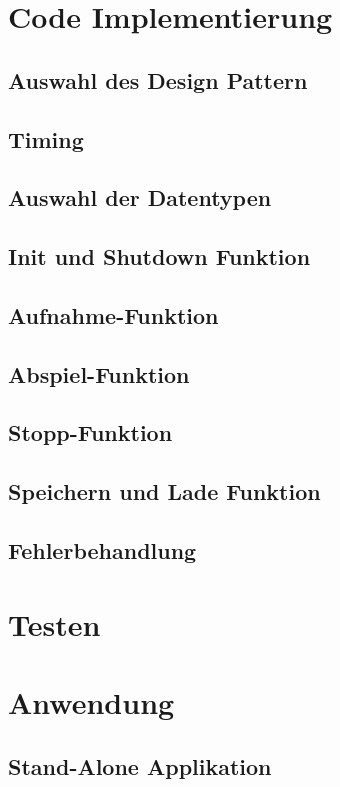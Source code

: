 \section{Code Implementierung}
		\subsection{Auswahl des Design Pattern} %
		\subsection{Timing}
		\subsection{Auswahl der Datentypen}

		\subsection{Init und Shutdown Funktion}	%
		\subsection{Aufnahme-Funktion}	
		\subsection{Abspiel-Funktion}
		\subsection{Stopp-Funktion}
		\subsection{Speichern und Lade Funktion}
			
		\subsection{Fehlerbehandlung}

\section{Testen}		

\section{Anwendung}
	\subsection{Stand-Alone Applikation}
